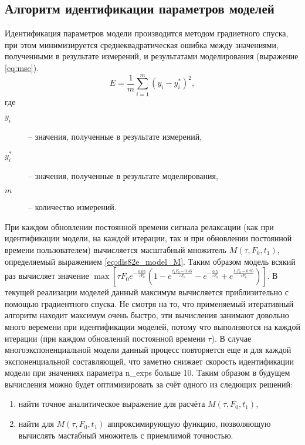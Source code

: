 	\subsection{Алгоритм идентификации параметров моделей}
	Идентификация параметров модели производится методом градиетного 
	спуска, при этом минимизируется среднеквадратическая ошибка между 
	значениями, полученными в результате измерений, и результатами 
	моделирования (выражение \ref{eq:mse}).
	\begin{equation}
		\label{eq:mse}
		E = \frac{1}{m}\sum_{i=1}^{m}\left(y_i - y_i^*\right)^2,
	\end{equation}
	где
	\begin{description}
		\item[$y_i$] -- значения, полученные в результате измерений,
		\item[$y_i^*$] -- значения, полученные в результате моделирования,
		\item[$m$] -- количество измерений.
	\end{description}
	При каждом обновлении постоянной времени сигнала релаксации (как при 
	идентификации модели, на каждой итерации, так и при обновлении постоянной 
	времени пользователем) вычисляется масштабный множитель $M(\tau, F_0, t_1)$, 
	определяемый выражением \ref{eq:dls82e_model_M}. Таким образом модель 
	всякий раз вычисляет значение 	
	\(
		\max{\left[
	    \tau F_0 e^{-\frac{0.05}{\tau F_0}}
	    \left(1-e^{\frac{t_1 F_0-0.45}{\tau F_0}}
	    -e^{-\frac{0.5}{\tau F_0}}+
	    e^{\frac{t_1 F_0-0.95}{\tau F_0}}\right)
	    \right]}
    \).
    В текущей реализации моделей данный максимум вычисляется приблизительно
    с помощью градиентного спуска. Не смотря на то, что применяемый итеративный
    алгоритм находит максимум очень быстро, эти вычисления занимают довольно 
    много веремени при идентификации моделей, потому что выполняются на 
    каждой итерации (при каждом обновлений постоянной времени $\tau$). В случае 
    многоэкспоненциальной модели данный процесс повторяется еще и для каждой 
    экспоненциальной составляющей, что заметно снижает скорость идентификации 
    модели при значениях параметра n\_exps больше 10. Таким образом в будущем 
    вычисления можно будет оптимизировать за счёт одного из следющих решений:
    \begin{enumerate}
    	\item найти точное аналитическое выражение для расчёта 
    	$M(\tau, F_0, t_1)$,
    	\item найти для $M(\tau, F_0, t_1)$ аппроксимирующую функцию, 
    	позволяющую вычислять мастабный множитель с приемлимой точностью.
    \end{enumerate}

